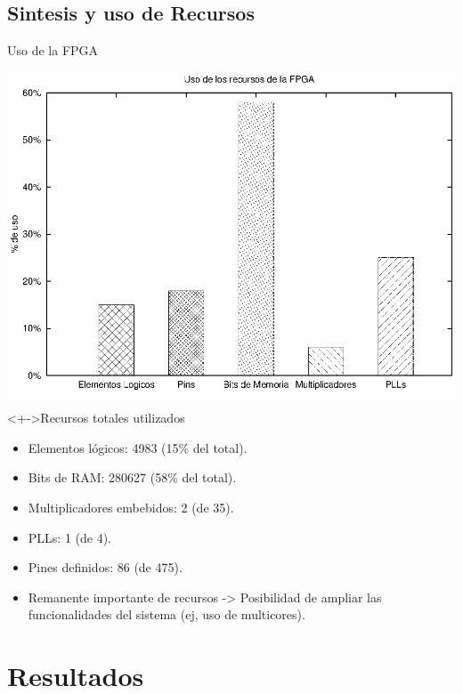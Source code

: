\documentclass[xcolor=dvipsnames]{beamer}
\begin{document}
\subsection{Sintesis y uso de Recursos}
\begin{frame}{Uso de la FPGA}

	\center	
	\includegraphics[scale=0.30]{figures/fpga.eps}  
	

   \begin{block}<+->{Recursos totales utilizados}	
    \begin{itemize}
	\scriptsize
     	\item Elementos lógicos: 4983 (15\% del total).
	\item Bits de RAM: 280627 (58\% del total).
	\item Multiplicadores embebidos: 2 (de 35).
	\item PLLs: 1 (de 4).
	\item Pines definidos: 86 (de 475).
	\item Remanente importante de recursos -> Posibilidad de ampliar las funcionalidades del sistema (ej, uso de multicores).
    \end{itemize}	
  \end{block}


\end{frame}


\section{Resultados}
\end{document}
